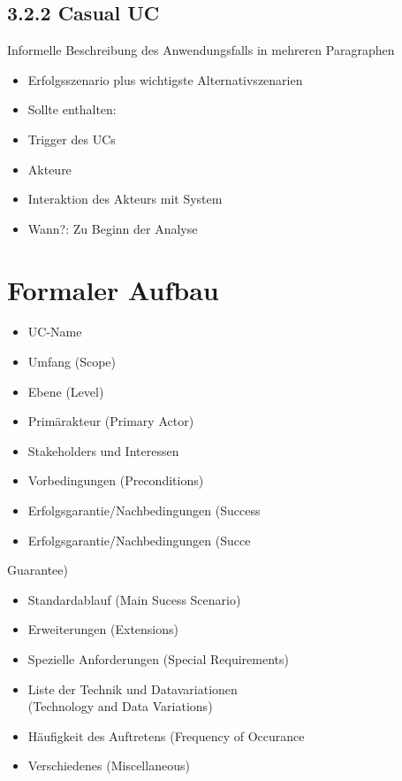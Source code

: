 \subsection*{3.2.2 Casual UC}
Informelle Beschreibung des Anwendungsfalls in mehreren Paragraphen

\begin{itemize}
  \item Erfolgsszenario plus wichtigste Alternativszenarien
  \item Sollte enthalten:
  \item Trigger des UCs
  \item Akteure
  \item Interaktion des Akteurs mit System
  \item Wann?: Zu Beginn der Analyse
\end{itemize}

\section*{Formaler Aufbau}
\begin{itemize}
  \item UC-Name
  \item Umfang (Scope)
  \item Ebene (Level)
  \item Primärakteur (Primary Actor)
  \item Stakeholders und Interessen
  \item Vorbedingungen (Preconditions)
  \item Erfolgsgarantie/Nachbedingungen (Success
  \item Erfolgsgarantie/Nachbedingungen (Succe
\end{itemize}

Guarantee)

\begin{itemize}
  \item Standardablauf (Main Sucess Scenario)
  \item Erweiterungen (Extensions)
  \item Spezielle Anforderungen (Special Requirements)
  \item Liste der Technik und Datavariationen\\
(Technology and Data Variations)
  \item Häufigkeit des Auftretens (Frequency of Occurance
  \item Verschiedenes (Miscellaneous)
\end{itemize}

